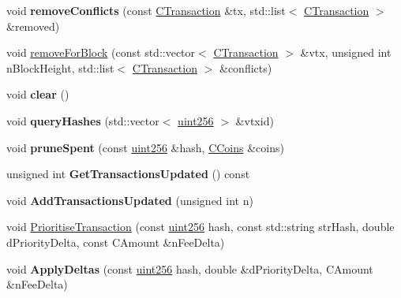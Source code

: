 \begin{DoxyCompactItemize}
void {\bfseries remove\+Conflicts} (const \mbox{\hyperlink{class_c_transaction}{C\+Transaction}} \&tx, std\+::list$<$ \mbox{\hyperlink{class_c_transaction}{C\+Transaction}} $>$ \&removed)
\item 
void \mbox{\hyperlink{class_c_tx_mem_pool_ac97207311007676bd7ef056a625e0e0a}{remove\+For\+Block}} (const std\+::vector$<$ \mbox{\hyperlink{class_c_transaction}{C\+Transaction}} $>$ \&vtx, unsigned int n\+Block\+Height, std\+::list$<$ \mbox{\hyperlink{class_c_transaction}{C\+Transaction}} $>$ \&conflicts)
\item 
\mbox{\label{class_c_tx_mem_pool_a6dba6bce4139392751321438a29b6b09}} 
void {\bfseries clear} ()
\item 
\mbox{\label{class_c_tx_mem_pool_a42fa7d41a45562d02e356f2e7708bb02}} 
void {\bfseries query\+Hashes} (std\+::vector$<$ \mbox{\hyperlink{classuint256}{uint256}} $>$ \&vtxid)
\item 
\mbox{\label{class_c_tx_mem_pool_ad6142b7cd3a58dae6cdaf03551c2f989}} 
void {\bfseries prune\+Spent} (const \mbox{\hyperlink{classuint256}{uint256}} \&hash, \mbox{\hyperlink{class_c_coins}{C\+Coins}} \&coins)
\item 
\mbox{\label{class_c_tx_mem_pool_afd2a709a0e6cb34a57ff2f9fd0774e6c}} 
unsigned int {\bfseries Get\+Transactions\+Updated} () const
\item 
\mbox{\label{class_c_tx_mem_pool_a3039b67e5eebaa3ff830261c192816f2}} 
void {\bfseries Add\+Transactions\+Updated} (unsigned int n)
\item 
void \mbox{\hyperlink{class_c_tx_mem_pool_a1a0a00279c941051af1b74c5ebeac40d}{Prioritise\+Transaction}} (const \mbox{\hyperlink{classuint256}{uint256}} hash, const std\+::string str\+Hash, double d\+Priority\+Delta, const C\+Amount \&n\+Fee\+Delta)
\item 
\mbox{\label{class_c_tx_mem_pool_aa73d1d5a211150fe169d73dc25ba3cdd}} 
void {\bfseries Apply\+Deltas} (const \mbox{\hyperlink{classuint256}{uint256}} hash, double \&d\+Priority\+Delta, C\+Amount \&n\+Fee\+Delta)
\item 
\mbox{\label{class_c_tx_mem_pool_a11dea05121ab8321e1d1f1a21ec5c9ac}} 

\end{DoxyCompactItemize}

